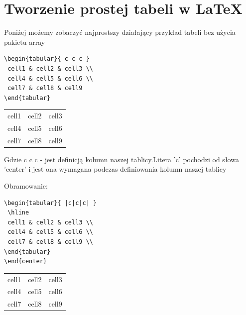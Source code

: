 \documentclass[table]{beamer}
\begin{document}
\section{Tworzenie prostej tabeli w LaTeX}
\begin{frame}[fragile]
 
Poniżej możemy zobaczyć najprostszy działający przykład tabeli bez użycia pakietu array

\begin{lstlisting}
\begin{tabular}{ c c c }
 cell1 & cell2 & cell3 \\ 
 cell4 & cell5 & cell6 \\  
 cell7 & cell8 & cell9    
\end{tabular}
\end{lstlisting}

\begin{center}
\begin{tabular}{ c c c }
 cell1 & cell2 & cell3 \\ 
 cell4 & cell5 & cell6 \\  
 cell7 & cell8 & cell9    
\end{tabular}
\end{center} 

Gdzie { c c c } - jest definicją kolumn naszej tablicy.Litera 'c' pochodzi od słowa 'center' i jest ona wymagana podczas definiowania kolumn naszej tablicy
 
\end{frame}

\begin{frame}[fragile]

Obramowanie:
\begin{lstlisting}
\begin{tabular}{ |c|c|c| } 
 \hline
 cell1 & cell2 & cell3 \\ 
 cell4 & cell5 & cell6 \\ 
 cell7 & cell8 & cell9 \\ 
\end{tabular}
\end{center}
\end{lstlisting}

\begin{center}
\begin{tabular}{ |c|c|c| } 
 \hline
 cell1 & cell2 & cell3 \\ 
 cell4 & cell5 & cell6 \\ 
 cell7 & cell8 & cell9 \\ 
\end{tabular}
\end{center}
\end{frame}
\end{document}
